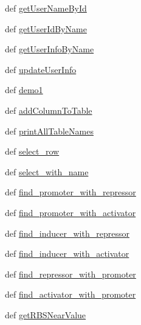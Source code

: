\begin{DoxyCompactItemize}
def \hyperlink{classweb_1_1database_1_1_sqlite_database_aefda2b881d0c6370530b23a1f715d363}{get\-User\-Name\-By\-Id}
\item 
def \hyperlink{classweb_1_1database_1_1_sqlite_database_adcd7db98f8fa2f1605047fa1da83be24}{get\-User\-Id\-By\-Name}
\item 
def \hyperlink{classweb_1_1database_1_1_sqlite_database_a6cb7b4acac40f09a21d38db605f1d725}{get\-User\-Info\-By\-Name}
\item 
def \hyperlink{classweb_1_1database_1_1_sqlite_database_aefe86fc2fe5bb4e9d4ed821ad789d93e}{update\-User\-Info}
\item 
def \hyperlink{classweb_1_1database_1_1_sqlite_database_a3873dfe7f76b813b9b3e3f7070a9e49c}{demo1}
\item 
def \hyperlink{classweb_1_1database_1_1_sqlite_database_a3f6909cf13ccb28d94be7100b6d1c6a6}{add\-Column\-To\-Table}
\item 
def \hyperlink{classweb_1_1database_1_1_sqlite_database_a6a94e47f3902345d6408e1e1442f8e2a}{print\-All\-Table\-Names}
\item 
def \hyperlink{classweb_1_1database_1_1_sqlite_database_a70d73e7e4456d5ce68036ff2c0bd9f87}{select\-\_\-row}
\item 
def \hyperlink{classweb_1_1database_1_1_sqlite_database_ade9bdb42860b95b3e0fe120a6eeef4af}{select\-\_\-with\-\_\-name}
\item 
def \hyperlink{classweb_1_1database_1_1_sqlite_database_ab7c8a4c22540ce6b4b1e6d79cac67b4d}{find\-\_\-promoter\-\_\-with\-\_\-repressor}
\item 
def \hyperlink{classweb_1_1database_1_1_sqlite_database_ac678393becbc9e9d71b798ee60359f55}{find\-\_\-promoter\-\_\-with\-\_\-activator}
\item 
def \hyperlink{classweb_1_1database_1_1_sqlite_database_a95c0d26c702c228f1d199af67bb2e2fc}{find\-\_\-inducer\-\_\-with\-\_\-repressor}
\item 
def \hyperlink{classweb_1_1database_1_1_sqlite_database_a8be37eb55c947350ceef6cc46348a79d}{find\-\_\-inducer\-\_\-with\-\_\-activator}
\item 
def \hyperlink{classweb_1_1database_1_1_sqlite_database_aa4cfc1fba6a00dee60d72c03ddaff46e}{find\-\_\-repressor\-\_\-with\-\_\-promoter}
\item 
def \hyperlink{classweb_1_1database_1_1_sqlite_database_ad94db33566965cb5458a1a6470214abb}{find\-\_\-activator\-\_\-with\-\_\-promoter}
\item 
def \hyperlink{classweb_1_1database_1_1_sqlite_database_ac7f96c047c5b0205fb847511bef7f671}{get\-R\-B\-S\-Near\-Value}

\end{DoxyCompactItemize}
